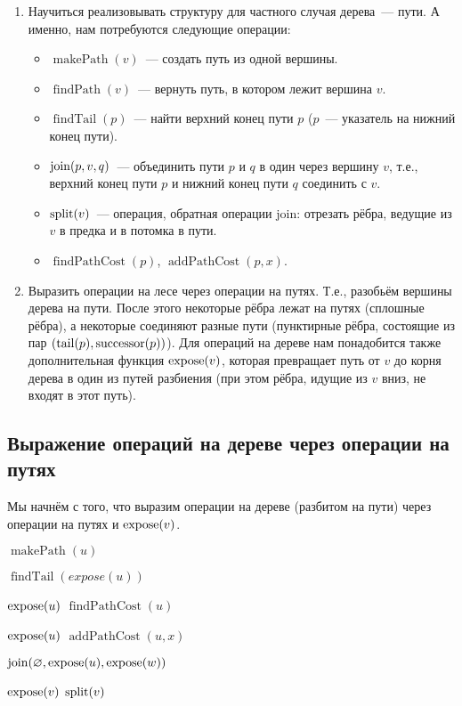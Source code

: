 \begin{enumerate}
    \item Научиться реализовывать структуру для частного случая дерева~--- пути. А именно, нам потребуются следующие операции:
        \begin{itemize}
            \item $\operatorname{makePath}(v)$~--- создать путь из одной вершины.
            \item $\operatorname{findPath}(v)$~--- вернуть путь, в котором лежит вершина $v$.
            \item $\operatorname{findTail}(p)$~--- найти верхний конец пути $p$ ($p$~--- указатель на нижний конец пути). 
            \item $\operatorname{join}(p, v, q)$~--- объединить пути $p$ и $q$ в один через вершину $v$, т.е., верхний конец пути $p$ и нижний конец пути $q$ соединить с $v$.
            \item $\operatorname{split}(v)$~--- операция, обратная операции join: отрезать рёбра, ведущие из $v$ в предка и в потомка в пути.
            \item $\operatorname{findPathCost}(p)$, $\operatorname{addPathCost}(p, x)$.
        \end{itemize}
    \item Выразить операции на лесе через операции на путях. Т.е., разобьём вершины дерева на пути. После этого некоторые рёбра лежат на путях (сплошные рёбра), а некоторые соединяют разные пути (пунктирные рёбра, состоящие из пар $(\operatorname{tail}(p), \operatorname{successor}(p))$). Для операций на дереве нам понадобится также дополнительная функция $\operatorname{expose}(v)$, которая превращает путь от $v$ до корня дерева в один из путей разбиения (при этом рёбра, идущие из $v$ вниз, не входят в этот путь).
\end{enumerate}

\subsection{Выражение операций на дереве через операции на путях}

Мы начнём с того, что выразим операции на дереве (разбитом на пути) через операции на путях и $\operatorname{expose}(v)$.

\begin{algorithmic}[1]
		\State $\operatorname{makePath}(u)$
	\EndProcedure

		\State $\operatorname{findTail}(expose(u))$
	\EndProcedure

		\State $\operatorname{expose}(u)$
		\State $\operatorname{findPathCost}(u)$
	\EndProcedure

		\State $\operatorname{expose}(u)$
		\State $\operatorname{addPathCost}(u, x)$
	\EndProcedure

		\State $\operatorname{join}(\varnothing, \operatorname{expose}(u), \operatorname{expose}(w))$
	\EndProcedure

		\State $\operatorname{expose}(v)$
		\State $\operatorname{split}(v)$
	\EndProcedure

\end{algorithmic}


